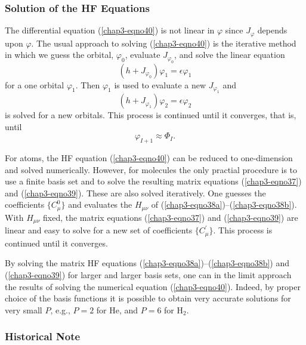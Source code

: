 \subsubsection{Solution of the HF Equations}

The differential equation (\ref{chap3-eqno40}) is not linear in
$\varphi$ since $J_{\varphi}$ depends upon $\varphi$.  The usual
approach to solving (\ref{chap3-eqno40}) is the iterative method in
which we guess the orbital, $\varphi_0$, evaluate $J_{\varphi_0}$, and
solve the linear equation
\begin{equation}
( h + J_{\varphi_0} ) \varphi_1 = \epsilon \varphi_1
\end{equation}
for a one orbital $\varphi_1$.  Then $\varphi_1$ is used to evaluate a new 
$J_{\varphi_1}$ and
\begin{equation}
( h + J_{\varphi_1} ) \varphi_2 = \epsilon \varphi_2
\end{equation}
is solved for a new orbitals.  This process is continued until it 
converges, that is, until
\begin{equation}
\varphi_{I+1} \approx \Phi_I .
\end{equation}

For atoms, the HF equation (\ref{chap3-eqno40}) can be reduced to
one-dimension and solved numerically.  However, for molecules the only
practial procedure is to use a finite basis set and to solve the
resulting matrix equations (\ref{chap3-eqno37}) and
(\ref{chap3-eqno39}).  These are also solved iteratively.  One guesses
the coefficients $\{C^0_{\mu} \}$ and evaluates the $H_{\mu \nu}$ of
(\ref{chap3-eqno38a})--(\ref{chap3-eqno38b}).  With $H_{\mu \nu}$
fixed, the matrix equations (\ref{chap3-eqno37}) and
(\ref{chap3-eqno39}) are linear and easy to solve for a new set of
coefficients $\{ C^{\prime}_{\mu} \}$. This process is continued until
it converges.

By solving the matrix HF equations
(\ref{chap3-eqno38a})--(\ref{chap3-eqno38b}) and (\ref{chap3-eqno39})
for larger and larger basis sets, one can in the limit approach the
results of solving the numerical equation (\ref{chap3-eqno40}).  Indeed,
by proper choice of the basis functions it is possible to obtain very
accurate solutions for very small $P$, e.g., $P = 2$ for He, and $P =
6$ for H$_2$.

\subsubsection{Historical Note}


